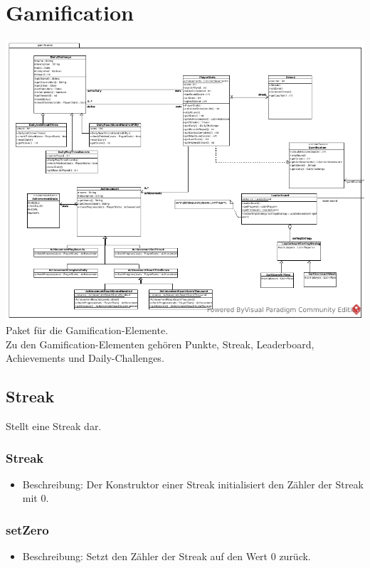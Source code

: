 \documentclass[a4paper]{scrreprt}
\begin{document}
    \section{Gamification}
    \includegraphics[width=\textwidth]{img/package/gamification.pdf}\\
    Paket für die Gamification-Elemente. \\
    Zu den Gamification-Elementen gehören Punkte, Streak, Leaderboard, Achievements und Daily-Challenges.


    \subsection{Streak}
    Stellt eine Streak dar.

    \subsubsection{Streak}
    \begin{itemize}
        \item Beschreibung: Der Konstruktor einer Streak initialisiert den Zähler der Streak mit 0.
    \end{itemize}
    \subsubsection{setZero}
    \begin{itemize}
        \item Beschreibung: Setzt den Zähler der Streak auf den Wert 0 zurück.
    \end{itemize}
\end{document}
